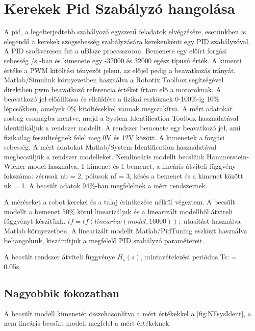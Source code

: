 \section{Kerekek Pid Szabályzó hangolása}

A pid, a legelterjedtebb szabályozó egyszerű feladatok elvégzésére, esetünkben is elegendő a kerekek szögsebesség szabályzására kerekenkénti egy PID szabályzóval. A PID szoftveresen fut a uBlaze processzoron. Bemenete egy előírt forgási sebesség \degree/s -ban és kimenete egy -32000 és 32000 egész típusú érték. A kimenti értéke a PWM kitöltési tényezőt jeleni, az előjel pedig a beavatkozás irányát.
Matlab/Simulink környezetben használva a Robotix Toolbox segítségével direktben pwm beavatkozó referencia értéket írtam elő a motoroknak. A beavatkozó jel előállítása és elküldése a fizikai eszköznek 0-100\%-ig 10\% lépcsőkben, amelyek 0\% kitöltésekkel vannak megszakítva. A mért adatokat rosbag csomagba mentve, majd a System Identification Toolbox használatával identifikáljuk a rendszer modellt. A rendszer bemenete egy beavatkozó jel, ami fizikailag feszültségnek felel meg 0V és 12V között. A kimenetek a forgási sebesség.
A mért adatokat Matlab/System Identification használatával megbecsüljük a rendszer modelleket. Nemlineáris modellt becslünk 
Hammerstein-Wiener model \cite{matlabhwmmodel} használva, 1 kimenet és 1 bemenet, a lineáris átviteli függvény fokszáma:
zérusok nb = 2, pólusok nf = 3, késés a bemenet és a kimenet között nk = 1. A becsült adatok 94\%-ban megfelelnek a mért rendszernek.          

A méréseket a robot kerekei és a talaj érintkezése nélkül végeztem.
A becsült modellt a bemenet 50\%  körül linearizáljuk és a linearizált modellből átviteli függvényt készítünk. 
$tf = tf(linearize(model,16000));$ utasítást használva Matlab környezetben. A linearizált modellt Matlab/PidTuning eszközt használva behangolunk, kiszámítjuk a megfelelő PID szabályzó paramétereit.



A becsült rendszer átviteli függvénye $H_s(z)$, mintavételezési periódus Ts: = 0.05s.

\subsection*{Nagyobbik fokozatban}

A becsült modell kimenetét összehasonlítva a mért értékekkel a \ref{fig:NFsysIdent}, a nem lineáris becsült modell megfelel a mért értékeknek.


